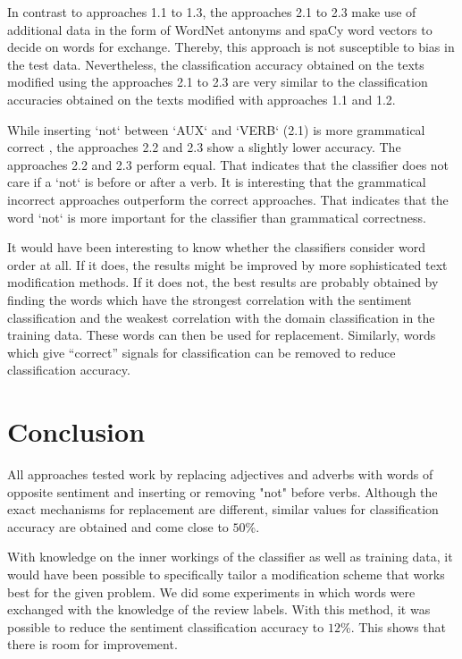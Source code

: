 \documentclass[11pt,a4paper]{article}
\begin{document}
In contrast to approaches 1.1 to 1.3, the approaches 2.1 to 2.3 make use of additional data in the form of WordNet antonyms and spaCy word vectors to decide on words for exchange. Thereby, this approach is not susceptible to bias in the test data. Nevertheless, the classification accuracy obtained on the texts modified using the approaches 2.1 to 2.3 are very similar to the classification accuracies obtained on the texts modified with approaches 1.1 and 1.2. 

While inserting ‘not‘ between ‘AUX‘ and ‘VERB‘ (2.1) is more grammatical correct , the approaches 2.2 and 2.3 show a slightly lower accuracy. The approaches 2.2 and 2.3 perform equal. That indicates that the classifier does not care if a ‘not‘ is before or after a verb. It is interesting that the grammatical incorrect approaches outperform the correct approaches. That indicates that the word ‘not‘ is more important for the classifier than grammatical correctness.

It would have been interesting to know whether the classifiers consider word order at all. If it does, the results might be improved by more sophisticated text modification methods. If it does not, the best results are probably obtained by finding the words which have the strongest correlation with the sentiment classification and the weakest correlation with the domain classification in the training data. These words can then be used for replacement. Similarly, words which give ``correct'' signals for classification can be removed to reduce classification accuracy.

\section{Conclusion}
All approaches tested work by replacing adjectives and adverbs with words of opposite sentiment and inserting or removing "not" before verbs. Although the exact mechanisms for replacement are different,  similar values for classification accuracy are obtained and come close to $50$\%.

With knowledge on the inner workings of the classifier as well as training data, it would have been possible to specifically tailor a modification scheme that works best for the given problem. We did some experiments in which words were exchanged with the knowledge of the review labels. With this method, it was possible to reduce the sentiment classification accuracy to $12$\%. This shows that there is room for improvement.



\end{document}
